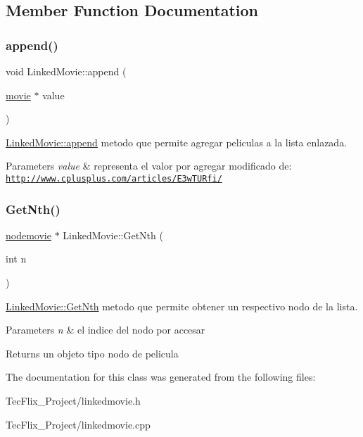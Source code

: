 \subsection{Member Function Documentation}
\mbox{\label{classLinkedMovie_a2c7101f06839c16d7648b7b5e0266a35}} 
\subsubsection{\texorpdfstring{append()}{append()}}
{\footnotesize\ttfamily void Linked\+Movie\+::append (\begin{DoxyParamCaption}\item[{\hyperlink{classmovie}{movie} $\ast$}]{value }\end{DoxyParamCaption})}



\hyperlink{classLinkedMovie_a2c7101f06839c16d7648b7b5e0266a35}{Linked\+Movie\+::append} metodo que permite agregar peliculas a la lista enlazada. 


\begin{DoxyParams}{Parameters}
{\em value} & representa el valor por agregar modificado de\+: \href{http://www.cplusplus.com/articles/E3wTURfi/}{\tt http\+://www.\+cplusplus.\+com/articles/\+E3w\+T\+U\+Rfi/} \\
\hline
\end{DoxyParams}
\mbox{\label{classLinkedMovie_a7a281c3d7e77bd0784f9ca4ce0e9deb3}} 
\subsubsection{\texorpdfstring{Get\+Nth()}{GetNth()}}
{\footnotesize\ttfamily \hyperlink{classnodemovie}{nodemovie} $\ast$ Linked\+Movie\+::\+Get\+Nth (\begin{DoxyParamCaption}\item[{int}]{n }\end{DoxyParamCaption})}



\hyperlink{classLinkedMovie_a7a281c3d7e77bd0784f9ca4ce0e9deb3}{Linked\+Movie\+::\+Get\+Nth} metodo que permite obtener un respectivo nodo de la lista. 


\begin{DoxyParams}{Parameters}
{\em n} & el indice del nodo por accesar \\
\hline
\end{DoxyParams}
\begin{DoxyReturn}{Returns}
un objeto tipo nodo de pelicula 
\end{DoxyReturn}


The documentation for this class was generated from the following files\+:\begin{DoxyCompactItemize}
\item 
Tec\+Flix\+\_\+\+Project/linkedmovie.\+h\item 
Tec\+Flix\+\_\+\+Project/linkedmovie.\+cpp\end{DoxyCompactItemize}
